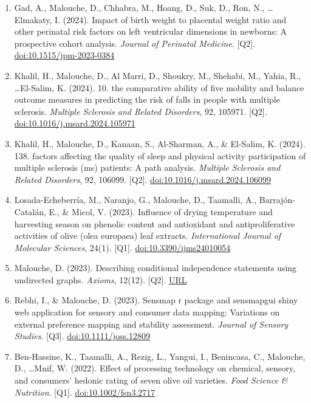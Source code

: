\documentclass[11pt,a4paper,sans]{moderncv}
\begin{document}
\begin{enumerate}
\item Gad, A., Malouche, D., Chhabra, M., Hoang, D., Suk, D., Ron, N., \ldots Elmakaty, I. (2024). Impact of birth weight to placental weight ratio and other perinatal risk factors on left ventricular dimensions in newborns: A prospective cohort analysis. \textit{Journal of Perinatal Medicine}. [Q2]. \href{https://doi.org/10.1515/jpm-2023-0384}{doi:10.1515/jpm-2023-0384}
\item Khalil, H., Malouche, D., Al Marri, D., Shoukry, M., Shehabi, M., Yahia, R., \ldots El-Salim, K. (2024). 10. the comparative ability of five mobility and balance outcome measures in predicting the risk of falls in people with multiple sclerosis. \textit{Multiple Sclerosis and Related Disorders}, 92, 105971. [Q2]. \href{https://doi.org/10.1016/j.msard.2024.105971}{doi:10.1016/j.msard.2024.105971}
\item Khalil, H., Malouche, D., Kanaan, S., Al-Sharman, A., \& El-Salim, K. (2024). 138. factors affecting the quality of sleep and physical activity participation of multiple sclerosis (ms) patients: A path analysis. \textit{Multiple Sclerosis and Related Disorders}, 92, 106099. [Q2]. \href{https://doi.org/10.1016/j.msard.2024.106099}{doi:10.1016/j.msard.2024.106099}
\item Losada-Echeberría, M., Naranjo, G., Malouche, D., Taamalli, A., Barrajón-Catalán, E., \& Micol, V. (2023). Influence of drying temperature and harvesting season on phenolic content and antioxidant and antiproliferative activities of olive (olea europaea) leaf extracts. \textit{International Journal of Molecular Sciences}, 24(1). [Q1]. \href{https://doi.org/10.3390/ijms24010054}{doi:10.3390/ijms24010054}
\item Malouche, D. (2023). Describing conditional independence statements using undirected graphs. \textit{Axioms}, 12(12). [Q2]. \href{https://www.mdpi.com/2075-1680/12/12/1109}{URL}
\item Rebhi, I., \& Malouche, D. (2023). Sensmap r package and sensmapgui shiny web application for sensory and consumer data mapping: Variations on external preference mapping and stability assessment. \textit{Journal of Sensory Studies}. [Q3]. \href{http://doi.org/10.1111/joss.12809}{doi:10.1111/joss.12809}
\item Ben-Hassine, K., Taamalli, A., Rezig, L., Yangui, I., Benincasa, C., Malouche, D., \ldots Mnif, W. (2022). Effect of processing technology on chemical, sensory, and consumers' hedonic rating of seven olive oil varieties. \textit{Food Science \& Nutrition}. [Q1]. \href{https://doi.org/10.1002/fsn3.2717}{doi:10.1002/fsn3.2717}

\end{enumerate}
\end{document}
